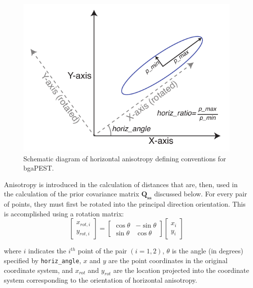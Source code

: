 \documentclass[11pt,oneside,onecolumn]{usgsreport}
\begin{document}
\begin{appendix}
\begin{figure}[H]
\begin{center}\includegraphics{figures/anisotropy}\end{center}

\caption{\label{fig:anisotropy}Schematic diagram of horizontal anisotropy
defining conventions for bgaPEST. }
\end{figure}


Anisotropy is introduced in the calculation of distances that are,
then, used in the calculation of the prior covariance matrix $\mathbf{Q_{ss}}$
discussed below. For every pair of points, they must first be rotated
into the principal direction orientation. This is accomplished using
a rotation matrix:
\[
\left[\begin{array}{c}
x_{rot,i}\\
y_{rot,i}
\end{array}\right]=\left[\begin{array}{cc}
\cos\theta & -\sin\theta\\
\sin\theta & \cos\theta
\end{array}\right]\left[\begin{array}{c}
x_{i}\\
y_{i}
\end{array}\right]
\]


where $i$ indicates the $i^{th}$ point of the pair $\left(i=1,2\right)$,
$\theta$ is the angle (in degrees) specified by \texttt{horiz\_angle},
$x$ and $y$ are the point coordinates in the original coordinate
system, and $x_{rot}$ and $y_{rot}$ are the location projected into
the coordinate system corresponding to the orientation of horizontal
anisotropy. 


\end{appendix}
\end{document}
